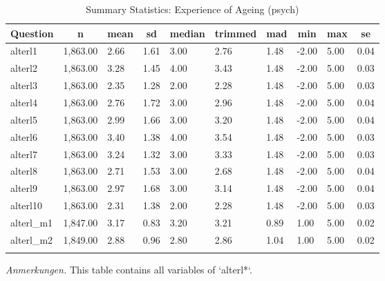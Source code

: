 \documentclass[
  doc]{apa6}
\begin{document}
\begin{table}[tbp]

\begin{center}
\begin{threeparttable}

\caption{\label{tab:tabsumstatalterpsych}Summary Statistics: Experience of Ageing (psych)}

\begin{tabular}{llllllllll}
\toprule
Question & \multicolumn{1}{c}{n} & \multicolumn{1}{c}{mean} & \multicolumn{1}{c}{sd} & \multicolumn{1}{c}{median} & \multicolumn{1}{c}{trimmed} & \multicolumn{1}{c}{mad} & \multicolumn{1}{c}{min} & \multicolumn{1}{c}{max} & \multicolumn{1}{c}{se}\\
\midrule
alterl1 & 1,863.00 & 2.66 & 1.61 & 3.00 & 2.76 & 1.48 & -2.00 & 5.00 & 0.04\\
alterl2 & 1,863.00 & 3.28 & 1.45 & 4.00 & 3.43 & 1.48 & -2.00 & 5.00 & 0.03\\
alterl3 & 1,863.00 & 2.35 & 1.28 & 2.00 & 2.28 & 1.48 & -2.00 & 5.00 & 0.03\\
alterl4 & 1,863.00 & 2.76 & 1.72 & 3.00 & 2.96 & 1.48 & -2.00 & 5.00 & 0.04\\
alterl5 & 1,863.00 & 2.99 & 1.66 & 3.00 & 3.20 & 1.48 & -2.00 & 5.00 & 0.04\\
alterl6 & 1,863.00 & 3.40 & 1.38 & 4.00 & 3.54 & 1.48 & -2.00 & 5.00 & 0.03\\
alterl7 & 1,863.00 & 3.24 & 1.32 & 3.00 & 3.33 & 1.48 & -2.00 & 5.00 & 0.03\\
alterl8 & 1,863.00 & 2.71 & 1.53 & 3.00 & 2.68 & 1.48 & -2.00 & 5.00 & 0.04\\
alterl9 & 1,863.00 & 2.97 & 1.68 & 3.00 & 3.14 & 1.48 & -2.00 & 5.00 & 0.04\\
alterl10 & 1,863.00 & 2.31 & 1.38 & 2.00 & 2.28 & 1.48 & -2.00 & 5.00 & 0.03\\
alterl\_m1 & 1,847.00 & 3.17 & 0.83 & 3.20 & 3.21 & 0.89 & 1.00 & 5.00 & 0.02\\
alterl\_m2 & 1,849.00 & 2.88 & 0.96 & 2.80 & 2.86 & 1.04 & 1.00 & 5.00 & 0.02\\
\bottomrule
\addlinespace
\end{tabular}

\begin{tablenotes}[para]
\normalsize{\textit{Anmerkungen.} This table contains all variables of `alterl*`.}
\end{tablenotes}

\end{threeparttable}
\end{center}

\end{table}
\end{document}
